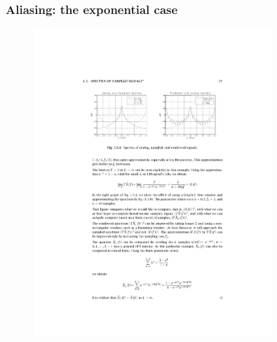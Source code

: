\begin{frame}
\frametitle{Aliasing: the exponential case}
\begin{figure}
  \centering
  \includegraphics[width=0.8\textwidth]{aliasing-expo}\\
\end{figure}
\end{frame}

